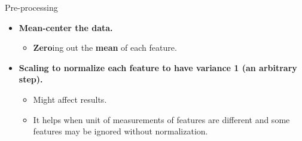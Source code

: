 \documentclass[serif, aspectratio=169]{beamer}
\DeclareMathOperator*{\argmax}{argmax}
\DeclareMathOperator*{\argmin}{argmin}
\begin{document}

\begin{frame}{Pre-processing}
    \begin{itemize}
        \item \textbf{Mean-center the data.}
            \begin{itemize}
                \item \textbf{Zero}ing out the \textbf{mean} of each feature.\\
            \end{itemize}
            
        \item \textbf{Scaling to normalize each feature to have variance 1 (an arbitrary step).}
            \begin{itemize}
                \item Might affect results.
                \item It helps when unit of measurements of features are different and some features may be ignored without normalization.
            \end{itemize}
    \end{itemize}
\end{frame}
\end{document}
